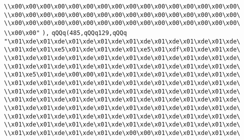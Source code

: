 \verb|\\x00\x00\x00\x00\x00\x00\x00\x00\x00\x00\x00\x00\x00\x00\x00\x00\|\newline
\verb|\\x00\x00\x00\x00\x00\x00\x00\x00\x00\x00\x00\x00\x00\x00\x00\x00\|\newline
\verb|\\x00\x00\x00\x00\x00\x00\x00\x00\x00\x00\x00\x00\x00\x00\x00\x00\|\newline
\verb|\\x00\x00"|\newline
\verb|),|\newline
\verb|qQQq(485,qQQq129,qQQq|\newline
\verb|"\x01\xde\x01\xde\x01\xde\x01\xde\x01\xde\x01\xde\x01\xde\x01\xde\|\newline
\verb|\\x01\xde\x01\xe5\x01\xde\x01\xde\x01\xe5\x01\xdf\x01\xde\x01\xde\|\newline
\verb|\\x01\xde\x01\xde\x01\xde\x01\xde\x01\xde\x01\xde\x01\xde\x01\xde\|\newline
\verb|\\x01\xde\x01\xde\x01\xde\x01\xde\x01\xde\x01\xde\x01\xde\x01\xde\|\newline
\verb|\\x01\xe5\x01\xde\x00\x00\x01\xde\x01\xde\x01\xde\x01\xde\x01\xde\|\newline
\verb|\\x01\xde\x01\xde\x01\xde\x01\xde\x01\xde\x01\xde\x01\xde\x01\xde\|\newline
\verb|\\x01\xde\x01\xde\x01\xde\x01\xde\x01\xde\x01\xde\x01\xde\x01\xde\|\newline
\verb|\\x01\xde\x01\xde\x01\xde\x01\xde\x01\xde\x01\xde\x01\xde\x01\xde\|\newline
\verb|\\x01\xde\x01\xde\x01\xde\x01\xde\x01\xde\x01\xde\x01\xde\x01\xde\|\newline
\verb|\\x01\xde\x01\xde\x01\xde\x01\xde\x01\xde\x01\xde\x01\xde\x01\xde\|\newline
\verb|\\x01\xde\x01\xde\x01\xde\x01\xde\x01\xde\x01\xde\x01\xde\x01\xde\|\newline
\verb|\\x01\xde\x01\xde\x01\xde\x01\xde\x00\x00\x01\xde\x01\xde\x01\xde\|\newline
